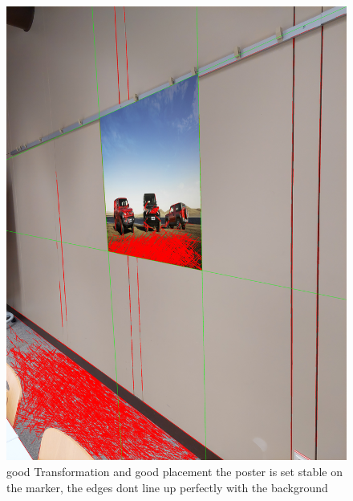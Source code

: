 \documentclass[a4paper,twocolumn]{article}
\begin{document}
\begin{figure}[h!]
\centering
\includegraphics[width=0.9\columnwidth]{img/20221115_113424.jpg} %
\caption{good Transformation and good placement the poster is set stable on the marker, the edges dont line up perfectly with the background}
\label{fig:20221115_113424.jpg}
\end{figure}
\end{document}
